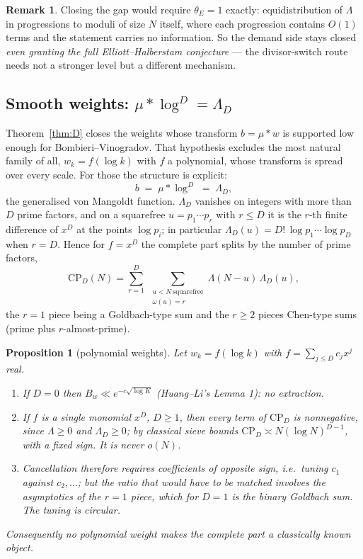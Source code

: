 \documentclass[11pt,a4paper]{article}
\theoremstyle{plain}
\newtheorem{proposition}[theorem]{Proposition}
\theoremstyle{definition}
\newtheorem{remark}[theorem]{Remark}
\begin{document}
\begin{remark}
Closing the gap would require $\theta_E = 1$ exactly: equidistribution
of $\Lambda$ in progressions to moduli of size $N$ itself, where each
progression contains $O(1)$ terms and the statement carries no
information. So the demand side stays closed \emph{even granting the
full Elliott--Halberstam conjecture} --- the divisor-switch route needs
not a stronger level but a different mechanism.
\end{remark}

\subsection{Smooth weights: $\mu * \log^D = \Lambda_D$}
\label{sec:Dpp}

Theorem~\ref{thm:D} closes the weights whose transform $b=\mu*w$ is
supported low enough for Bombieri--Vinogradov. That hypothesis
excludes the most natural family of all, $w_k = f(\log k)$ with $f$ a
polynomial, whose transform is spread over every scale. For those the
structure is explicit:
\[
  b \;=\; \mu * \log^D \;=\; \Lambda_D,
\]
the generalised von Mangoldt function. $\Lambda_D$ vanishes on
integers with more than $D$ prime factors, and on a squarefree
$u=p_1\cdots p_r$ with $r\le D$ it is the $r$-th finite difference of
$x^D$ at the points $\log p_i$; in particular $\Lambda_D(u) =
D!\,\log p_1\cdots\log p_D$ when $r=D$. Hence for $f = x^D$ the
complete part splits by the number of prime factors,
\[
  \mathrm{CP}_D(N) = \sum_{r=1}^{D}\ \sum_{\substack{u<N\ \text{squarefree}\\ \omega(u)=r}}
   \Lambda(N-u)\,\Lambda_D(u),
\]
the $r=1$ piece being a Goldbach-type sum and the $r\ge2$ pieces
Chen-type sums (prime plus $r$-almost-prime).

\begin{proposition}[polynomial weights]\label{prop:Dpp}
Let $w_k = f(\log k)$ with $f=\sum_{j\le D}c_jx^j$ real.
\begin{enumerate}
\item[(i)] If $D=0$ then $B_w \ll e^{-c\sqrt{\log K}}$ (Huang--Li's
  Lemma 1): no extraction.
\item[(ii)] If $f$ is a single monomial $x^D$, $D\ge1$, then every
  term of $\mathrm{CP}_D$ is nonnegative, since $\Lambda\ge0$ and
  $\Lambda_D\ge0$; by classical sieve bounds
  $\mathrm{CP}_D \asymp N(\log N)^{D-1}$, with a fixed sign. It is
  never $o(N)$.
\item[(iii)] Cancellation therefore requires coefficients of opposite
  sign, i.e.\ tuning $c_1$ against $c_2,\dots$; but the ratio that
  would have to be matched involves the asymptotics of the $r=1$
  piece, which for $D=1$ \emph{is} the binary Goldbach sum. The tuning
  is circular.
\end{enumerate}
Consequently no polynomial weight makes the complete part a
classically known object.
\end{proposition}
\end{document}
